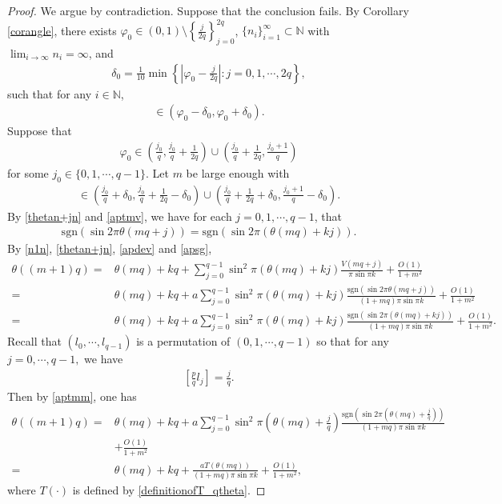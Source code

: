 \documentclass[12pt]{amsart}
\newcommand{\abs}[1]{\left\lvert #1 \right\rvert}
\theoremstyle{plain}
\theoremstyle{definition}
\begin{document}
\begin{proof} We argue by contradiction. Suppose that the conclusion fails.
	By Corollary \ref{corangle}, there exists $\varphi_0\in (0,1)\setminus\left\{\frac{j}{2q}\right\}_{j=0}^{2q}$, $\{n_i\}_{i=1}^\infty\subset \mathbb{N}$ with $\lim_{i\to\infty}n_i=\infty$, and 
	\begin{align}
		\delta_0=\frac{1}{10}\min\left\{\abs{\varphi_0-\frac{j}{2q}}:j=0,1,\cdots,2q\right\},\label{apd0v0}
	\end{align}
	 such that for any $i\in\mathbb{N}$,
	\begin{align}
		[\theta(n_iq)]\in (\varphi_0-\delta_0,\varphi_0+\delta_0).\label{apthetain}
	\end{align}
	Suppose that  
	\begin{align}
		 \varphi_0\in \left(\frac{j_0}{q},\frac{j_0}{q}+\frac{1}{2q}\right)\cup \left(\frac{j_0}{q}+\frac{1}{2q},\frac{j_0+1}{q}\right)\label{apvarphi}
	\end{align}for some $j_0\in\{0,1,\cdots,q-1\}$. 
	Let  $m$ be large enough with 
	\begin{align}
		[\theta(mq)]\in \left(\frac{j_0}{q}+\delta_0,\frac{j_0}{q}+\frac{1}{2q}-\delta_0\right)\cup\left(\frac{j_0}{q}+\frac{1}{2q}+\delta_0,\frac{j_0+1}{q}-\delta_0\right).\label{aptmv}
	\end{align}
	By \eqref{thetan+jn} and \eqref{aptmv}, we have for each $j=0,1,\cdots,q-1$, that
	\begin{align}
	\mathrm{sgn}(\sin2\pi\theta(mq+j))=\mathrm{sgn}\left(\sin2\pi\left(\theta(mq)+kj\right)\right).\label{apsg}
	\end{align}
By \eqref{n1n}, \eqref{thetan+jn}, \eqref{apdev} and \eqref{apsg},
\begin{align}
	\theta((m+1)q)=&\theta(mq)+kq+\sum_{j=0}^{q-1}\sin^2\pi\left(\theta(mq)+kj\right)\frac{V(mq+j)}{\pi\sin\pi k}+\frac{O(1)}{1+m^2}\nonumber\\
	=&\theta(mq)+kq+a\sum_{j=0}^{q-1}\sin^2\pi\left(\theta(mq)+kj\right)\frac{\mathrm{sgn}(\sin2\pi\theta(mq+j))}{(1+mq)\pi\sin\pi k}+\frac{O(1)}{1+m^2}\nonumber\\
\label{aptmm}=&\theta(mq)+kq+a\sum_{j=0}^{q-1}\sin^2\pi\left(\theta(mq)+kj\right)\frac{\mathrm{sgn}(\sin2\pi(\theta(mq)+kj))}{(1+mq)\pi\sin\pi k}+\frac{O(1)}{1+m^2}.
\end{align}
Recall that  $(l_0,\cdots, l_{q-1})$ is a permutation of $(0,1,\cdots,q-1)$ so that for any $j=0,\cdots,q-1,$ we have
\begin{align}
	\left[\frac{p}{q}l_j\right]=\frac{j}{q}.\nonumber
\end{align}
Then by \eqref{aptmm}, one has
\begin{align}
	\theta((m+1)q)=&\theta(mq)+kq+a\sum_{j=0}^{q-1}\sin^2\pi\left(\theta(mq)+\frac{j}{q}\right)\frac{\mathrm{sgn}(\sin2\pi(\theta(mq)+\frac{j}{q}))}{(1+mq)\pi\sin\pi k}\nonumber\\
	&+\frac{O(1)}{1+m^2}\nonumber\\
	=&\theta(mq)+kq+\frac{aT(\theta(mq))}{(1+mq)\pi\sin\pi k}+\frac{O(1)}{1+m^2},\label{appttmmt}
\end{align}
where $T(\cdot)$ is defined by \eqref{definitionofT_qtheta}. 


\end{proof}
\end{document}
